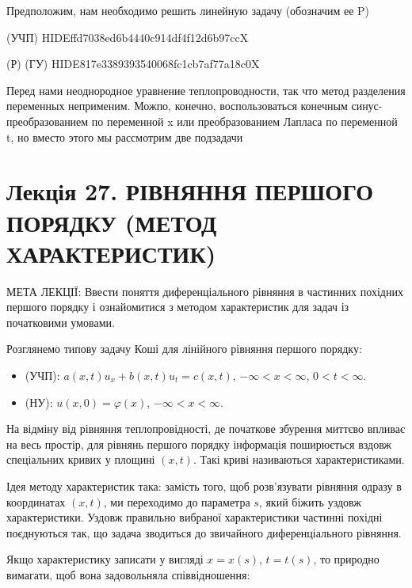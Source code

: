 \documentclass[
  ukrainian,
]{article}
\providecommand{\tightlist}{%
  \setlength{\itemsep}{0pt}\setlength{\parskip}{0pt}}
\begin{document}
Предположим, нам необходимо решить линейную задачу (обозначим ее P)

(УЧП) HIDEffd7038ed6b4440c914df4f12d6b97ccX

(Р) (ГУ) HIDE817e3389393540068fc1cb7af77a18c0X

Перед нами неоднородное уравнение теплопроводности, так что метод
разделения переменных неприменим. Можпо, конечно, воспользоваться
конечным синус-преобразованием по переменной x или преобразованием
Лапласа по переменной t, но вместо этого мы рассмотрим две подзадачи

\section{Лекція 27. РІВНЯННЯ ПЕРШОГО ПОРЯДКУ (МЕТОД
ХАРАКТЕРИСТИК)}\label{ux43bux435ux43aux446ux456ux44f-27.-ux440ux456ux432ux43dux44fux43dux43dux44f-ux43fux435ux440ux448ux43eux433ux43e-ux43fux43eux440ux44fux434ux43aux443-ux43cux435ux442ux43eux434-ux445ux430ux440ux430ux43aux442ux435ux440ux438ux441ux442ux438ux43a}

МЕТА ЛЕКЦІЇ: Ввести поняття диференціального рівняння в частинних
похідних першого порядку і ознайомитися з методом характеристик для
задач із початковими умовами.

Розглянемо типову задачу Коші для лінійного рівняння першого порядку:

\begin{itemize}
\tightlist
\item
  (УЧП): \(a(x,t)u_x + b(x,t)u_t = c(x,t)\), \(-\infty < x < \infty\),
  \(0 < t < \infty\).
\item
  (НУ): \(u(x,0) = \varphi(x)\), \(-\infty < x < \infty\).
\end{itemize}

На відміну від рівняння теплопровідності, де початкове збурення миттєво
впливає на весь простір, для рівнянь першого порядку інформація
поширюється вздовж спеціальних кривих у площині \((x,t)\). Такі криві
називаються характеристиками.

Ідея методу характеристик така: замість того, щоб розв'язувати рівняння
одразу в координатах \((x,t)\), ми переходимо до параметра \(s\), який
біжить уздовж характеристики. Уздовж правильно вибраної характеристики
частинні похідні поєднуються так, що задача зводиться до звичайного
диференціального рівняння.

Якщо характеристику записати у вигляді \(x=x(s)\), \(t=t(s)\), то
природно вимагати, щоб вона задовольняла співвідношення:
\end{document}
